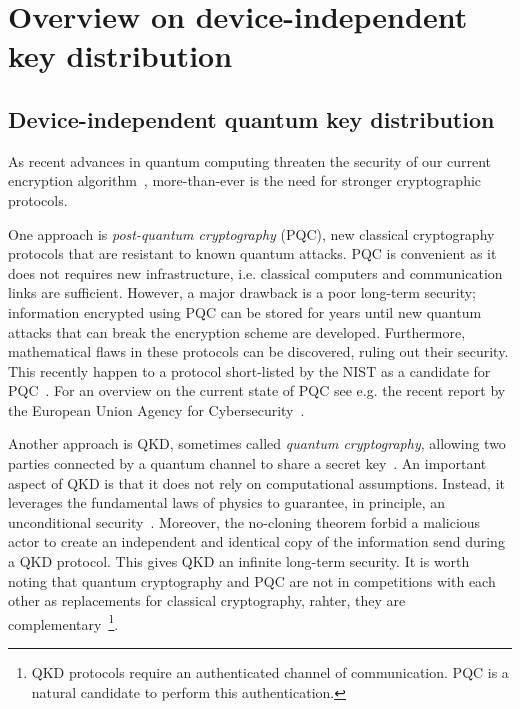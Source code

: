 \chapter{Overview on device-independent key distribution}

\section{Device-independent quantum key distribution}

As recent advances in quantum computing threaten the security of our current encryption algorithm~\cite{Shor1994,Gouzien2021,Gouzien2023}, more-than-ever is the need for stronger cryptographic protocols. 

One approach is \textit{post-quantum cryptography} (PQC), new classical cryptography protocols that are resistant to known quantum attacks.
PQC is convenient as it does not requires new infrastructure, i.e. classical computers and communication links are sufficient. 
However, a major drawback is a poor long-term security; information encrypted using PQC can be stored for years until new quantum attacks that can break the encryption scheme are developed. 
Furthermore, mathematical flaws in these protocols can be discovered, ruling out their security.
This recently happen to a protocol short-listed by the NIST as a candidate for PQC~\cite{Castryck2022}.
For an overview on the current state of PQC see e.g. the recent report by the European Union Agency for Cybersecurity~\cite{EUAC2021}.

Another approach is \acrfull{QKD}, sometimes called \textit{quantum cryptography}, allowing two parties connected by a quantum channel to share a secret key~\cite{Bennett84,Ekert1991,Gisin2002,Scarani2009}.
An important aspect of \acrshort{QKD} is that it does not rely on computational assumptions.
Instead, it leverages the fundamental laws of physics to guarantee, in principle, an unconditional security~\cite{Shor2000,Mayers2001}.
Moreover, the no-cloning theorem forbid a malicious actor to create an independent and identical copy of the information send during a \acrshort{QKD} protocol.
This gives \acrshort{QKD} an infinite long-term security.
It is worth noting that quantum cryptography and PQC are not in competitions with each other as replacements for classical cryptography, rahter, they are complementary~\footnote{QKD protocols require an authenticated channel of communication. PQC is a natural candidate to perform this authentication.}.

\medbreak 

